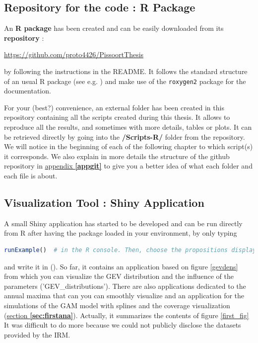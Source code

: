 
\subsection*{Repository for the code : R Package}

An \textbf{R package} has been created and can be easily downloaded from its \textbf{repository} :
\begin{center}\label{xxx}
 \url{https://github.com/proto4426/PissoortThesis}
\end{center}
by following the instructions in the README. It follows the standard structure of an usual R package (see e.g. \citet{leisch_creating_2008}) and make use of the \texttt{roxygen2} package for the documentation.

For your (best?) convenience, an external folder has been created in this repository containing all the scripts created during this thesis. It allows to reproduce all the results, and sometimes with more details, tables or plots. It can be retrieved directly by going into the \textbf{/Scripts-R/} folder from the repository. We will notice in the beginning of each of the following chapter to which script(s) it corresponds. We also explain in more details the structure of the github repository in \hyperref[appgit]{appendix \textbf{\ref{appgit}}} to give you a better idea of what each folder and each file is about.

\subsection*{Visualization Tool : Shiny Application}

A small Shiny application has started to be developed and can be run directly from R after having the package loaded in your environment, by only typing 

\begin{center}
\begin{lstlisting}[language=R]
runExample()  # in the R console. Then, choose the propositions displayed
\end{lstlisting}
\end{center}
and write it in (). So far, it contains an application based on figure \ref{gevdens} from which you can visualize the GEV distribution and the influence of the parameters ('GEV\_distributions'). There are also applications dedicated to the annual maxima that can you can smoothly visualize and an application for the simulations of the GAM model with splines and the coverage visualization (\hyperref[sec:firstana]{section \textbf{\ref{sec:firstana}}}).  Actually, it summarizes the contents of figure \ref{first_fig} It was difficult to do more because we could not publicly disclose the datasets provided by the IRM.



